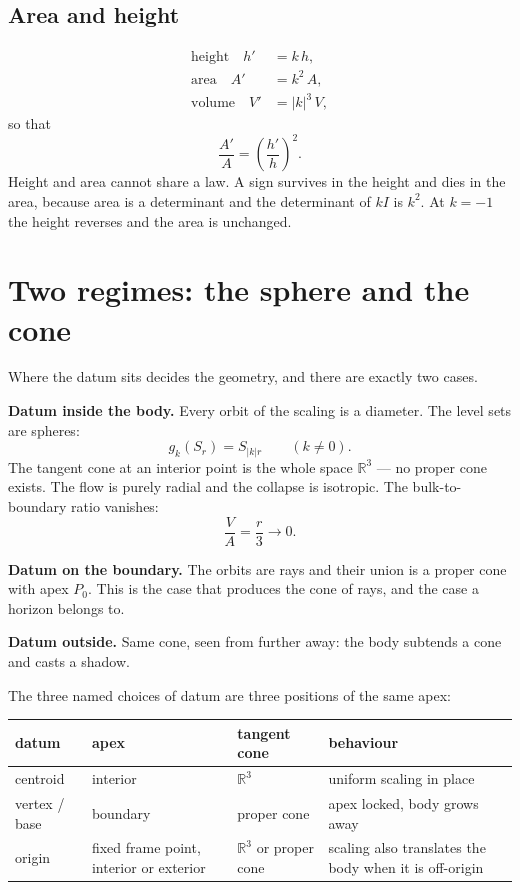 \documentclass[11pt,fleqn]{article}
\begin{document}
\subsection*{Area and height}

\begin{align}
\text{height}\quad h' &= k\,h, \\
\text{area}\quad A' &= k^2\,A, \\
\text{volume}\quad V' &= |k|^3\,V,
\end{align}
so that
\begin{equation}
\frac{A'}{A} = \left(\frac{h'}{h}\right)^{2}.
\end{equation}
Height and area cannot share a law. A sign survives in the height and dies in the area, because
area is a determinant and the determinant of $kI$ is $k^2$. At $k = -1$ the height reverses and
the area is unchanged.

\section{Two regimes: the sphere and the cone}

Where the datum sits decides the geometry, and there are exactly two cases.

\textbf{Datum inside the body.} Every orbit of the scaling is a diameter. The level sets are
spheres:
\begin{equation}
g_k(S_r) = S_{|k|r} \qquad (k \neq 0).
\end{equation}
The tangent cone at an interior point is the whole space $\mathbb{R}^3$ --- no proper cone exists.
The flow is purely radial and the collapse is isotropic. The bulk-to-boundary ratio vanishes:
\begin{equation}
\frac{V}{A} = \frac{r}{3} \to 0.
\end{equation}

\textbf{Datum on the boundary.} The orbits are rays and their union is a proper cone with apex
$P_0$. This is the case that produces the cone of rays, and the case a horizon belongs to.

\textbf{Datum outside.} Same cone, seen from further away: the body subtends a cone and casts a
shadow.

The three named choices of datum are three positions of the same apex:

\begin{table}[H]
\centering
\small
\begin{tabular}{@{}l>{\raggedright\arraybackslash}p{3.4cm}>{\raggedright\arraybackslash}p{2.8cm}>{\raggedright\arraybackslash}p{4.2cm}@{}}
\toprule
datum & apex & tangent cone & behaviour \\
\midrule
centroid & interior & $\mathbb{R}^3$ & uniform scaling in place \\
vertex / base & boundary & proper cone & apex locked, body grows away \\
origin & fixed frame point, interior or exterior & $\mathbb{R}^3$ or proper cone &
scaling also translates the body when it is off-origin \\
\bottomrule
\end{tabular}
\end{table}
\end{document}
